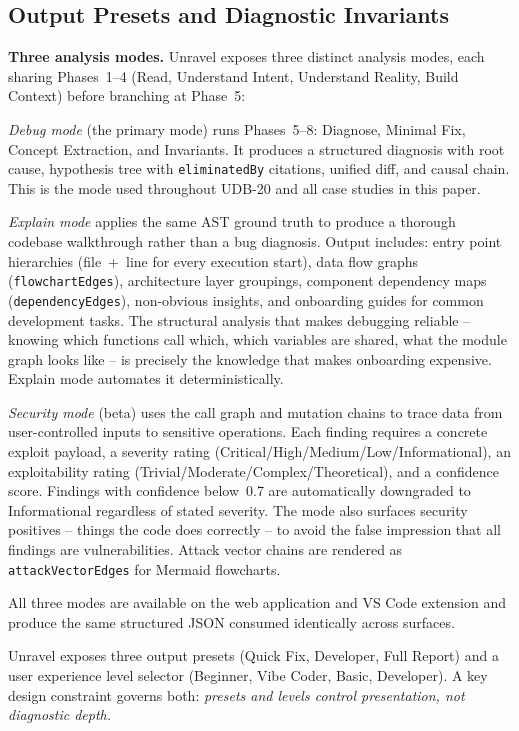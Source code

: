 \documentclass[12pt,a4paper]{article}
\newcommand{\code}[1]{\texttt{\small #1}}
\begin{document}
\clearpage
\subsection{Output Presets and Diagnostic Invariants}

\textbf{Three analysis modes.} Unravel exposes three distinct analysis modes, each
sharing Phases~1--4 (Read, Understand Intent, Understand Reality, Build Context) before
branching at Phase~5:

\textit{Debug mode} (the primary mode) runs Phases~5--8: Diagnose, Minimal Fix,
Concept Extraction, and Invariants. It produces a structured diagnosis with root cause,
hypothesis tree with \code{eliminatedBy} citations, unified diff, and causal chain.
This is the mode used throughout UDB-20 and all case studies in this paper.

\textit{Explain mode} applies the same AST ground truth to produce a thorough codebase
walkthrough rather than a bug diagnosis. Output includes: entry point hierarchies
(file~+~line for every execution start), data flow graphs (\code{flowchartEdges}),
architecture layer groupings, component dependency maps (\code{dependencyEdges}),
non-obvious insights, and onboarding guides for common development tasks. The structural
analysis that makes debugging reliable -- knowing which functions call which, which
variables are shared, what the module graph looks like -- is precisely the knowledge that
makes onboarding expensive. Explain mode automates it deterministically.

\textit{Security mode} (beta) uses the call graph and mutation chains to trace data
from user-controlled inputs to sensitive operations. Each finding requires a concrete
exploit payload, a severity rating (Critical/High/Medium/Low/Informational), an
exploitability rating (Trivial/Moderate/Complex/Theoretical), and a confidence score.
Findings with confidence below~0.7 are automatically downgraded to Informational
regardless of stated severity. The mode also surfaces security positives -- things the
code does correctly -- to avoid the false impression that all findings are vulnerabilities.
Attack vector chains are rendered as \code{attackVectorEdges} for Mermaid flowcharts.

All three modes are available on the web application and VS Code extension and produce
the same structured JSON consumed identically across surfaces.

Unravel exposes three output presets (Quick Fix, Developer, Full Report) and a user
experience level selector (Beginner, Vibe Coder, Basic, Developer). A key design
constraint governs both: \textit{presets and levels control presentation, not diagnostic
depth.}
\end{document}
